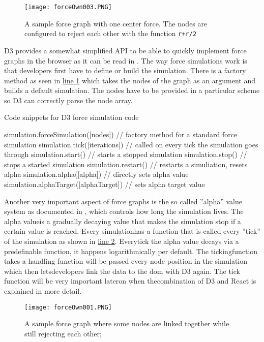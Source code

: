 \begin{figure}
  \centering
  \texttt{[image: forceOwn003.PNG]}
  \caption{A sample force graph with one center force. The nodes are configured to reject each other with the function \texttt{r+r/2}}
  \label{fig:force004}
\end{figure}

D3 provides a somewhat simplified API to be able to quickly implement force graphs in the browser as it can be read in \cite[/d3-force/blob/master/README.md]{D3Github}. The way force simulations work is that developers first have to define or build the simulation. There is a factory method as seen in \hyperref[prog:simulation]{line 1} which takes the nodes of the graph as an argument and builds a default simulation. The nodes have to be provided in a particular scheme so D3 can correctly parse the node array. 

\begin{program}
\caption{Code snippets for D3 force simulation code}
\label{prog:simulation}
\begin{JsCode}
simulation.forceSimulation([nodes]) // factory method for a standard force simulation
simulation.tick([iterations]) // called on every tick the simulation goes through
simulation.start() // starts a stopped simulation
simulation.stop() // stops a started simulation
simulation.restart() // restarts a simuliation, resets alpha
simulation.alpha([alpha]) // directly sets alpha value
simulation.alphaTarget([alphaTarget]) // sets alpha target value
\end{JsCode}
\end{program}

Another very important aspect of force graphs is the so called ''alpha'' value system as documented in \cite[/d3-force/blob/master/README.md]{D3Github}, which controls how long the simulation lives. The alpha valueis a gradually decaying value that makes the simulation stop if a certain value is reached. Every simulationhas a function that is called every ''tick'' of the simulation as shown in \hyperref[prog:simulation]{line 2}. Everytick the alpha value decays via a predefinable function, it happens logarithmically per default. The tickingfunction takes a handling function will be passed every node position in the simulation which then letsdevelopers link the data to the dom with D3 again. The tick function will be very important lateron when thecombination of D3 and React is explained in more detail.

\begin{figure}
    \centering
    \texttt{[image: forceOwn001.PNG]}
    \caption{A sample force graph where some nodes are linked together while still rejecting each other;}
    \label{fig:force005}
  \end{figure}

